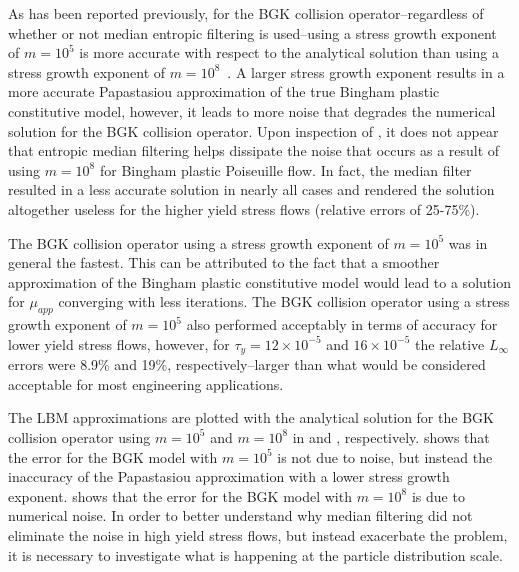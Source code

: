 \documentclass[pdftex,ms]{pittetd}
\begin{document}
As has been reported previously, for the BGK collision operator--regardless of whether or not median entropic filtering is used--using a stress growth exponent of $m = 10^5$ is more accurate with respect to the analytical solution than using a stress growth exponent of $m = 10^8$~\cite{chen2014simulations}.
A larger stress growth exponent results in a more accurate Papastasiou approximation of the true Bingham plastic constitutive model, however, it leads to more noise that degrades the numerical solution for the BGK collision operator.
Upon inspection of , it does not appear that entropic median filtering helps dissipate the noise that occurs as a result of using $m = 10^8$ for Bingham plastic Poiseuille flow.
In fact, the median filter resulted in a less accurate solution in nearly all cases and rendered the solution altogether useless for the higher yield stress flows (relative errors of 25-75\%).

The BGK collision operator using a stress growth exponent of $m = 10^5$ was in general the fastest.
This can be attributed to the fact that a smoother approximation of the Bingham plastic constitutive model would lead to a solution for $\mu_{app}$ converging with less iterations.
The BGK collision operator using a stress growth exponent of $m = 10^5$ also performed acceptably in terms of accuracy for lower yield stress flows, however, for $\tau_y = 12 \times 10^{-5}$ and $16 \times 10^{-5}$ the relative $L_\infty$ errors were 8.9\% and 19\%, respectively--larger than what would be considered acceptable for most engineering applications.

The LBM approximations are plotted with the analytical solution for the BGK collision operator using $m = 10^5$ and $m = 10^8$ in  and , respectively.
 shows that the error for the BGK model with $m = 10^5$ is not due to noise, but instead the inaccuracy of the Papastasiou approximation with a lower stress growth exponent.
 shows that the error for the BGK model with $m = 10^8$ is due to numerical noise.
In order to better understand why median filtering did not eliminate the noise in high yield stress flows, but instead exacerbate the problem, it is necessary to investigate what is happening at the particle distribution scale.
\end{document}
